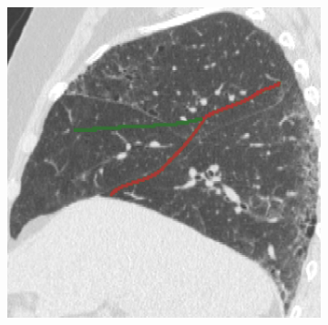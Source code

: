 {\begin{figure}[htbp]
\begin{subfigure}{.25\linewidth}
  \caption{}
  \label{fig:IPFSegmentationResults-a} 
\end{subfigure}
\hspace{.3in} %
\begin{subfigure}{.25\linewidth}%
  \includegraphics[width=\linewidth,trim={{.0\wd0} {.0\wd0} {.0\wd0} {.0\wd0}},clip]{Segmentation/Image/IPF203_PCAGuessing_Sagittal161.png}

\end{subfigure}
\end{figure}}
